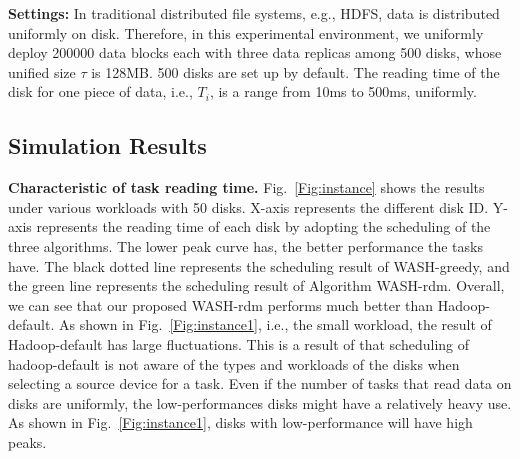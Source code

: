 \documentclass[conference]{IEEEtran}
\begin{document}

\textbf{Settings:}
In traditional distributed file systems, e.g., HDFS\cite{b19}, data is distributed uniformly on disk. Therefore, in this experimental environment, we uniformly deploy 200000 data blocks each with three data replicas among 500 disks, whose unified size $\tau$ is 128MB. 500 disks are set up by default. The reading time of the disk for one piece of data, i.e., $T_i$, is a range from 10ms to 500ms, uniformly. 



\subsection{Simulation Results}

\textbf{Characteristic of task reading time.} Fig.~\ref{Fig:instance} shows the results under various workloads with 50 disks. X-axis represents the different disk ID. Y-axis represents the reading time of each disk by adopting the scheduling of the three algorithms. The lower peak curve has, the better performance the tasks have. The black dotted line represents the scheduling result of WASH-greedy, and the green line represents the scheduling result of Algorithm WASH-rdm. Overall, we can see that our proposed WASH-rdm performs much better than Hadoop-default. As shown in Fig.~\ref{Fig:instance1}, i.e., the small workload, the result of Hadoop-default has large fluctuations. This is a result of that scheduling of hadoop-default is not aware of the types and workloads of the disks when selecting a source device for a task. Even if the number of tasks that read data on disks are uniformly, the low-performances disks might have a relatively heavy use. As shown in Fig.~\ref{Fig:instance1}, disks with low-performance will have high peaks. 
\end{document}
